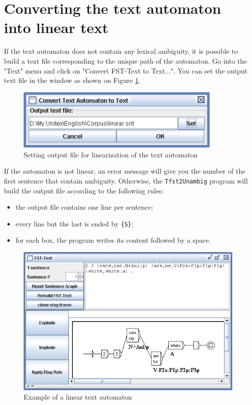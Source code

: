 \section{Converting the text automaton into linear text}
\label{section-linear-text}
If the text automaton does not contain any lexical ambiguity, it is possible to
build a text file corresponding to the unique path of the automaton. Go into the
"Text" menu and click on "Convert FST-Text to Text...". You can set the output
text file in the window as shown on Figure
\ref{fig-linearization-configuration}.

\begin{figure}[!ht]
\begin{center}
\includegraphics[width=10cm]{resources/img/fig7-25.png}
\caption{Setting output file for linearization of the text automaton\label{fig-linearization-configuration}}
\end{center}
\end{figure}

\bigskip
\noindent If the automaton is not linear, an error message will give you the number of
the first sentence that contain ambiguity. Otherwise, the \verb+Tfst2Unambig+ program
will build the output file according to the following rules:

\begin{itemize}
  \item the output file contains one line per sentence;
  \item every line but the last is ended by \verb+{S}+;
  \item for each box, the program writes its content followed by a space.
\end{itemize}

\begin{figure}[!ht]
\begin{center}
\includegraphics[width=12cm]{resources/img/fig7-26.png}
\caption{Example of a linear text automaton\label{fig-linear-automaton}}
\end{center}
\end{figure}

